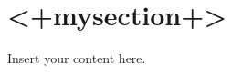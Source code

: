 %
%
%
%
%
%                





\title{\mysubject}
\author{\myauthor}
\date{\today}
\frame{\frametitle{\mytableofcontents}\tableofcontents}
\section{<+mysection+>}
\begin{frame}
    Insert your content here.
\end{frame}


